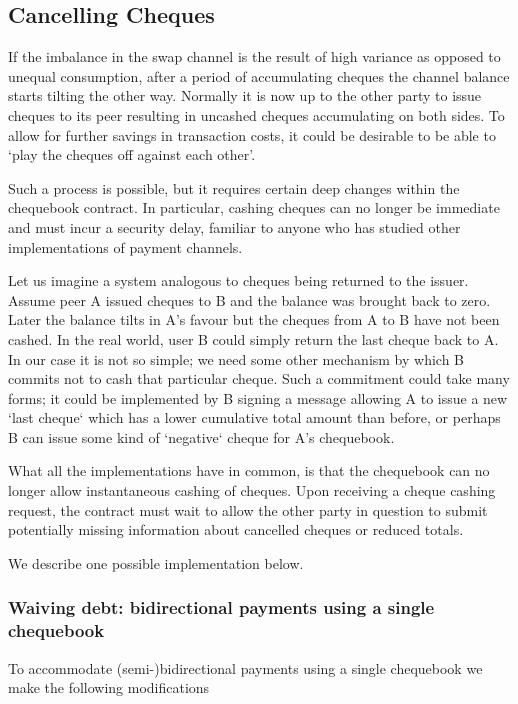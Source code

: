 \subsection{Cancelling Cheques}

If the imbalance in the swap channel is the result of high variance as opposed to unequal consumption, after a period of accumulating cheques the channel balance starts tilting the other way. Normally it is now up to the other party to issue cheques to its peer resulting in uncashed cheques accumulating on both sides.
To allow for further savings in transaction costs, it could be desirable to be able to `play the cheques off against each other'.

Such a process is possible, but it requires certain deep changes within the chequebook contract. In particular, cashing cheques can no longer be immediate and must incur a security delay, familiar to anyone who has studied other implementations of payment channels.

Let us imagine a system analogous to cheques being returned to the issuer.  
Assume peer A issued cheques to B and the balance was brought back to zero. Later the balance tilts in A's favour but the cheques from A to B have not been cashed. In the real world, user B could simply return the last cheque back to A. In our case it is not so simple; we need some other mechanism by which B commits not to cash that particular cheque. Such a commitment could take many forms; it could be implemented by B signing a message allowing A to issue a new `last cheque` which has a lower cumulative total amount than before, or perhaps B can issue some kind of `negative` cheque for A's chequebook.

What all the implementations have in common, is that the chequebook can no longer allow instantaneous cashing of cheques. Upon receiving a cheque cashing request, the contract must wait to allow the other party in question to submit potentially missing information about cancelled cheques or reduced totals. 

We describe one possible implementation below.

\subsubsection{Waiving debt: bidirectional payments using a single chequebook }\label{subsubsec:waivingdebt}

To accommodate (semi-)bidirectional payments using a single chequebook we make the following modifications

